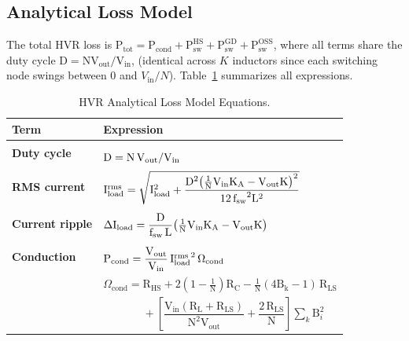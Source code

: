 \documentclass[conference]{IEEEtran}
\begin{document}
\vspace{-3pt}
\subsection{Analytical Loss Model}


The total HVR loss is
${\mathrm{P_{tot}} = \mathrm{P_{cond}} + \mathrm{P_{sw}^{HS}}
+ \mathrm{P_{sw}^{GD}} + \mathrm{P_{sw}^{OSS}}}$, where all terms
share the duty cycle $\mathrm{D} = \mathrm{NV_{out}/V_{in}}$, (identical across $K$ inductors since each switching
node swings between 0 and $V_\mathrm{in}/N$\cite{ECTCSal}).
Table~\ref{tab:loss} summarizes all expressions.
\vspace{-15pt}
\begin{table}[b]
\caption{HVR Analytical Loss Model Equations.}
\label{tab:loss}
\centering
\scriptsize
\setlength{\tabcolsep}{5pt}
\begin{tabular}{|l|p{5.9cm}|}
\hline
\textbf{Term} & \textbf{Expression} \\
\hline
\textbf{Duty cycle} &
$\rule{0pt}{4ex}\mathrm{D} = {\mathrm{N}\,\mathrm{V_{out}}} / {\mathrm{V_{in}}}$ \\[5pt]
\hline

\textbf{RMS current} &
$\rule{0pt}{5ex}\mathrm{I_{load}^{rms}} = \sqrt{\mathrm{I_{load}^{2}}
  + \dfrac{\mathrm{D}^{2}
    \!\left(\tfrac{1}{\mathrm{N}}\mathrm{V_{in}}\mathrm{K_A}
    - \mathrm{V_{out}}\mathrm{K}\right)^{2}}
    {12\,\mathrm{f_{sw}}^{2}\mathrm{L}^{2}}}$ \\[5pt]
\hline

\textbf{Current ripple} &
$\rule{0pt}{4ex}\Delta\mathrm{I_{load}} = \dfrac{\mathrm{D}}{\mathrm{f_{sw}}\,\mathrm{L}}
  \!\left(\tfrac{1}{\mathrm{N}}\mathrm{V_{in}}\mathrm{K_A}
  - \mathrm{V_{out}}\mathrm{K}\right)$ \\[5pt]
\hline

\textbf{Conduction} &
$\rule{0pt}{4ex}\mathrm{P_{cond}} = \dfrac{\mathrm{V_{out}}}{\mathrm{V_{in}}}
  \,\mathrm{{I_{load}^{rms}}^{2}}\,\Omega_\mathrm{cond}$ \\[5pt]

& $\Omega_\mathrm{cond} = \mathrm{R_{HS}}
  + 2\!\left(1 - \tfrac{1}{\mathrm{N}}\right)\!\mathrm{R_C} 
  - \tfrac{1}{\mathrm{N}}(4\mathrm{B_k} - 1)\,\mathrm{R_{LS}}$\\[3pt]

& $\phantom{\Omega_\mathrm{cond} = {}}
  + \!\left[\dfrac{\mathrm{V_{in}}(\mathrm{R_L} + \mathrm{R_{LS}})}
               {\mathrm{N}^{2}\mathrm{V_{out}}}
  + \dfrac{2\,\mathrm{R_{LS}}}{\mathrm{N}}\right]
  \!\sum_{k}\mathrm{B}_i^{2}$ \\[5pt]


\end{tabular}
\end{table}
\end{document}
